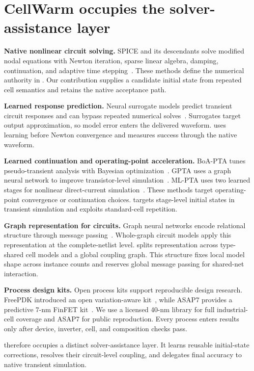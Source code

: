 \section{CellWarm occupies the solver-assistance layer}
\label{sec:related}

\noindent\textbf{Native nonlinear circuit solving.}
SPICE and its descendants solve modified nodal equations with Newton iteration, sparse linear algebra, damping, continuation, and adaptive time stepping~\cite{nagel1975spice3,quarles1993spice3,kundert1990steady}. These methods define the numerical authority in \system{}. Our contribution supplies a candidate initial state from repeated cell semantics and retains the native acceptance path.

\noindent\textbf{Learned response prediction.}
Neural surrogate models predict transient circuit responses and can bypass repeated numerical solves~\cite{cerny2022deep}. Surrogates target output approximation, so model error enters the delivered waveform. \system{} uses learning before Newton convergence and measures success through the native waveform.

\noindent\textbf{Learned continuation and operating-point acceleration.}
BoA-PTA tunes pseudo-transient analysis with Bayesian optimization~\cite{xing2022boa}. GPTA uses a graph neural network to improve transistor-level simulation~\cite{jin2025gpta}. ML-PTA uses two learned stages for nonlinear direct-current simulation~\cite{jin2025mlpta}. These methods target operating-point convergence or continuation choices. \system{} targets stage-level initial states in transient simulation and exploits standard-cell repetition.

\noindent\textbf{Graph representation for circuits.}
Graph neural networks encode relational structure through message passing~\cite{gilmer2017mpnn,velickovic2018gat,brody2022gatv2}. Whole-graph circuit models apply this representation at the complete-netlist level. \system{} splits representation across type-shared cell models and a global coupling graph. This structure fixes local model shape across instance counts and reserves global message passing for shared-net interaction.

\noindent\textbf{Process design kits.}
Open process kits support reproducible design research. FreePDK introduced an open variation-aware kit~\cite{stine2007freepdk}, while ASAP7 provides a predictive 7-nm FinFET kit~\cite{clark2016asap7}. We use a licensed 40-nm library for full industrial-cell coverage and ASAP7 for public reproduction. Every process enters results only after device, inverter, cell, and composition checks pass.

\system{} therefore occupies a distinct solver-assistance layer. It learns reusable initial-state corrections, resolves their circuit-level coupling, and delegates final accuracy to native transient simulation.

